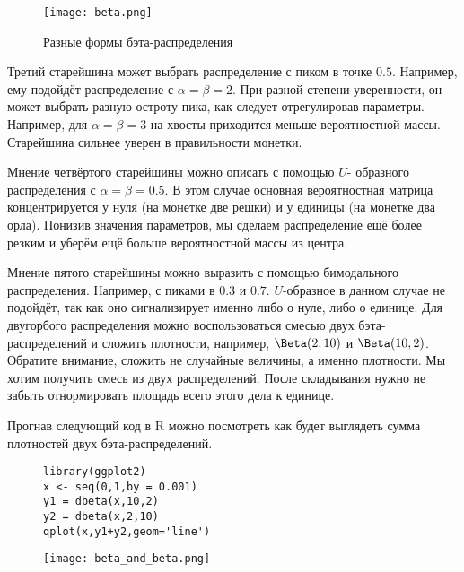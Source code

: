 \begin{figure}[t]
\begin{center}
	\texttt{[image: beta.png]}
\end{center} 
\caption{Разные формы бэта-распределения}  \label{beta_dist} 
\end{figure} 

Третий старейшина может выбрать распределение с пиком в точке $0.5$.   Например, ему подойдёт распределение с $\alpha = \beta = 2$. При разной степени уверенности, он может выбрать разную остроту пика, как следует отрегулировав параметры. Например, для $\alpha = \beta = 3$ на хвосты приходится меньше вероятностной массы. Старейшина сильнее уверен в правильности монетки. 

Мнение четвёртого старейшины можно описать с помощью $U$- образного распределения с $\alpha = \beta = 0.5$. В этом случае основная вероятностная матрица концентрируется у нуля (на монетке две решки) и у единицы (на монетке два орла). Понизив значения параметров, мы сделаем распределение ещё более резким и уберём ещё больше вероятностной массы из центра.

Мнение пятого старейшины можно выразить с помощью бимодального распределения. Например, с пиками в $0.3$ и $0.7$. $U$-образное в данном случае не подойдёт, так как оно сигнализирует именно либо о нуле, либо о единице. Для двугорбого распределения можно воспользоваться смесью двух бэта-распределений и сложить плотности, например, $\Beta(2,10)$ и $\Beta(10,2)$. Обратите внимание, сложить не случайные величины, а именно плотности. Мы хотим получить смесь из двух распределений. После складывания нужно не забыть отнормировать площадь всего этого дела к единице. 

Прогнав следующий код в R можно посмотреть как будет выглядеть сумма плотностей двух бэта-распределений. 

\begin{figure}[H]
\begin{minipage}{0.19\linewidth}
\end{minipage}
\hfill
\begin{minipage}{0.29\linewidth}
\begin{verbatim}
library(ggplot2)
x <- seq(0,1,by = 0.001)
y1 = dbeta(x,10,2)
y2 = dbeta(x,2,10)
qplot(x,y1+y2,geom='line')
\end{verbatim}
\end{minipage}
\hfill
\begin{minipage}[H]{0.49\linewidth}
\texttt{[image: beta\_and\_beta.png]}
\end{minipage}
\end{figure}

